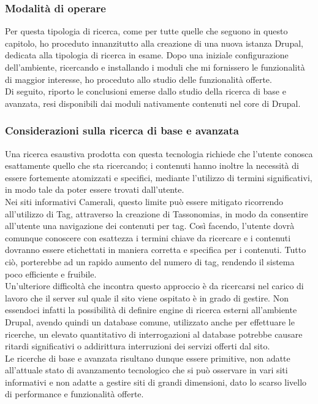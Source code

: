 			\subsubsection{Modalità di operare}
			Per questa tipologia di ricerca, come per tutte quelle che seguono in questo capitolo, ho proceduto innanzitutto alla creazione di una nuova istanza \gls{Drupal}, dedicata alla tipologia di ricerca in esame. Dopo una iniziale configurazione dell'ambiente, ricercando e installando i moduli che mi fornissero le funzionalità di maggior interesse, ho proceduto allo studio delle funzionalità offerte. \\
			Di seguito, riporto le conclusioni emerse dallo studio della ricerca di base e avanzata, resi disponibili dai moduli nativamente contenuti nel core di \gls{Drupal}.

			\subsubsection{Considerazioni sulla ricerca di base e avanzata}
			Una ricerca esaustiva prodotta con questa tecnologia richiede che l'utente conosca esattamente quello che sta ricercando; i contenuti hanno inoltre la necessità di essere fortemente atomizzati e specifici, mediante l'utilizzo di termini significativi, in modo tale da poter essere trovati dall'utente. \\
			Nei siti informativi Camerali, questo limite può essere mitigato ricorrendo all'utilizzo di \gls{Tag}, attraverso la creazione di \glspl{Tassonomia}, in modo da consentire all'utente una navigazione dei contenuti per tag. Così facendo, l'utente dovrà comunque conoscere con esattezza i termini chiave da ricercare e i contenuti dovranno essere etichettati in maniera corretta e specifica per i contenuti. Tutto ciò, porterebbe ad un rapido aumento del numero di tag, rendendo il sistema poco efficiente e fruibile. \\
			Un'ulteriore difficoltà che incontra questo approccio è da ricercarsi nel carico di lavoro che il server sul quale il sito viene ospitato è in grado di gestire. Non essendoci infatti la possibilità di definire engine di ricerca esterni all'ambiente \gls{Drupal}, avendo quindi un database comune, utilizzato anche per effettuare le ricerche, un elevato quantitativo di interrogazioni al database potrebbe causare ritardi significativi o addirittura interruzioni dei servizi offerti dal sito. \\
			Le ricerche di base e avanzata risultano dunque essere primitive, non adatte all'attuale stato di avanzamento tecnologico che si può osservare in vari siti informativi e non adatte a gestire siti di grandi dimensioni, dato lo scarso livello di performance e funzionalità offerte.
		
